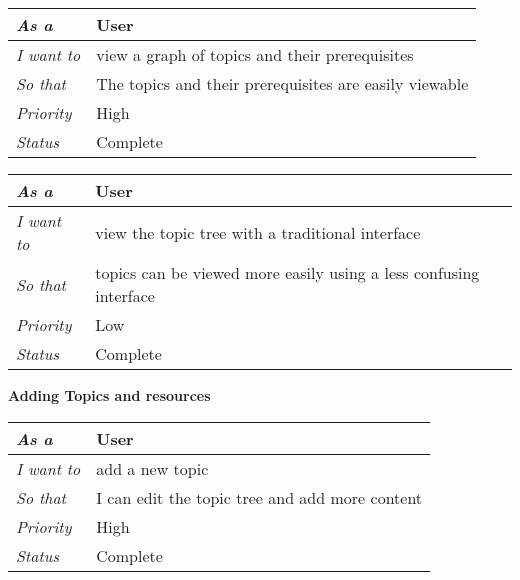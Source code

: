 \begin{table}[hp]
\begin{tabular}{ll}
\textit{As a}      & User                                                   \\ \hline
\textit{I want to} & view a graph of topics and their prerequisites         \\ \hline
\textit{So that}   & The topics and their prerequisites are easily viewable \\ \hline
\textit{Priority}  & {\color[HTML]{FE0000} High}                            \\ \hline
\textit{Status}    & Complete                                               \\ \hline      
\end{tabular}
\end{table}

\begin{table}[hp]
\begin{tabular}{ll}
\textit{As a}      & User                                                              \\ \hline
\textit{I want to} & view the topic tree with a traditional interface                  \\ \hline
\textit{So that}   & topics can be viewed more easily using a less confusing interface \\ \hline
\textit{Priority}  & {\color[HTML]{3166FF} Low}                                        \\ \hline
\textit{Status}    & Complete                                                          \\ \hline
\end{tabular}
\end{table}

\textbf{Adding Topics and resources}
\begin{table}[hp]
\begin{tabular}{ll}
\textit{As a}      & User                                           \\ \hline
\textit{I want to} & add a new topic                                \\ \hline
\textit{So that}   & I can edit the topic tree and add more content \\ \hline
\textit{Priority}  & {\color[HTML]{FE0000} High}                    \\ \hline
\textit{Status}    & Complete                                       \\ \hline              
\end{tabular}
\end{table}

